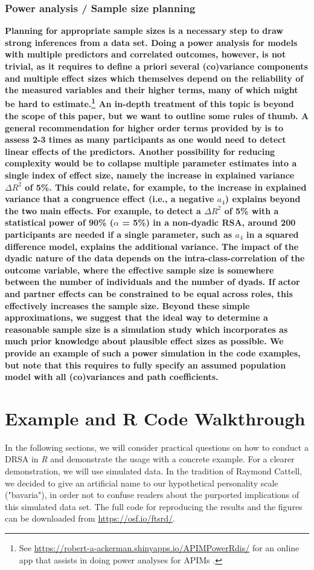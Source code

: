\documentclass[jou,a4paper,draftfirst]{apa6}
\newcommand{\added}[1]{\textcolor{colour_added}{\bf{#1}}}
\begin{document}
\subsubsection{Power analysis / Sample size planning}
\added{Planning for appropriate sample sizes is a necessary step to draw strong inferences from a data set. Doing a power analysis for models with multiple predictors and correlated outcomes, however, is not trivial, as it requires to define a priori several (co)variance components and multiple effect sizes which themselves depend on the reliability of the measured variables and their higher terms, many of which might be hard to estimate.\footnote{See \url{https://robert-a-ackerman.shinyapps.io/APIMPowerRdis/} for an online app that assists in doing power analyses for APIMs \parencite{Ackerman_Kenny_2016}.} An in-depth treatment of this topic is beyond the scope of this paper, but we want to outline some rules of thumb. A general recommendation for higher order terms provided by \textcite{Aiken_West_1991} is to assess 2-3 times as many participants as one would need to detect linear effects of the predictors. Another possibility for reducing complexity would be to collapse multiple parameter estimates into a single index of effect size, namely the increase in explained variance $\Delta R^2$ of 5\%. This could relate, for example, to the increase in explained variance that a congruence effect (i.e., a negative $a_4$) explains beyond the two main effects. For example, to detect a $\Delta R^2$ of 5\% with a statistical power of 90\% ($\alpha$ = 5\%) in a non-dyadic RSA, around 200 participants are needed if a single parameter, such as $a_4$ in a squared difference model, explains the additional variance. The impact of the dyadic nature of the data depends on the intra-class-correlation of the outcome variable, where the effective sample size is somewhere between the number of individuals and the number of dyads. If actor and partner effects can be constrained to be equal across roles, this effectively increases the sample size. Beyond these simple approximations, we suggest that the ideal way to determine a reasonable sample size is a simulation study \parencite{NestlerEtAl2015} which incorporates as much prior knowledge about plausible effect sizes as possible. We provide an example of such a power simulation in the code examples, but note that this requires to fully specify an assumed population model with all (co)variances and path coefficients.}

\section{Example and R Code Walkthrough} 
In the following sections, we will consider practical questions on how to conduct a DRSA in \textit{R} and demonstrate the usage with a concrete example. For a clearer demonstration, we will use simulated data. In the tradition of Raymond Cattell, we decided to give an artificial name to our hypothetical personality scale ("bavaria"), in order not to confuse readers about the purported implications of this simulated data set. The full code for reproducing the results and the figures can be downloaded from \url{https://osf.io/ftsrd/}.
\end{document}
